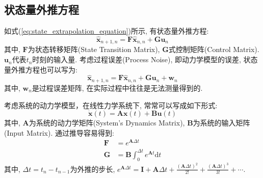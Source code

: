 \documentclass[12pt]{article}
\begin{document}
\subsection{状态量外推方程}

如式(\ref{eq:state_extrapolation_equation})所示, 有状态量外推方程:
\begin{equation*}
\hat{\bm{x}}_{n+1,n} = \bm{F} \hat{\bm{x}}_{n,n} + \bm{G} \bm{u}_n
\end{equation*}
其中, $\bm{F}$为状态转移矩阵(State Transition Matrix), $\bm{G}$式控制矩阵(Control Matrix). $\bm{u}_n$代表$t_n$时刻的输入量. 考虑过程误差(Process Noise), 即动力学模型的误差, 状态量外推方程也可以写为:
\begin{equation} \label{eq:state_extrapolation_equation_full}
\hat{\bm{x}}_{n+1,n} = \bm{F} \hat{\bm{x}}_{n,n} + \bm{G} \bm{u}_n + \bm{w}_n
\end{equation}
其中, $\bm{w}_n$是过程误差矩阵, 在实际过程中往往是无法测量得到的. 

考虑系统的动力学模型，在线性力学系统下, 常常可以写成如下形式:
\begin{equation} \label{eq:dynamical_model}
\dot{\bm{x}}(t) = \bm{A}\bm{x}(t) + \bm{B} \bm{u}(t)
\end{equation}
其中, $\bm{A}$为系统的动力学矩阵(System's Dynamics Matrix), $\bm{B}$为系统的输入矩阵(Input Matrix). 通过推导容易得到:
\begin{equation}
\begin{aligned}
\bm{F} &= e^{\bm{A}\Delta t} \\
\bm{G} &= \bm{B} \int_{0}^{\Delta t} e^{\bm{A}t} \mathrm{d}t
\end{aligned}
\end{equation}
其中, $\Delta t = t_n - t_{n-1}$为外推的步长, $e^{\bm{A}\Delta t} = \bm{I} + \bm{A}\Delta t + \frac{(\bm{A}\Delta t)^2}{2!} + \frac{(\bm{A}\Delta t)^3}{3!} + \cdots$. 
\end{document}
